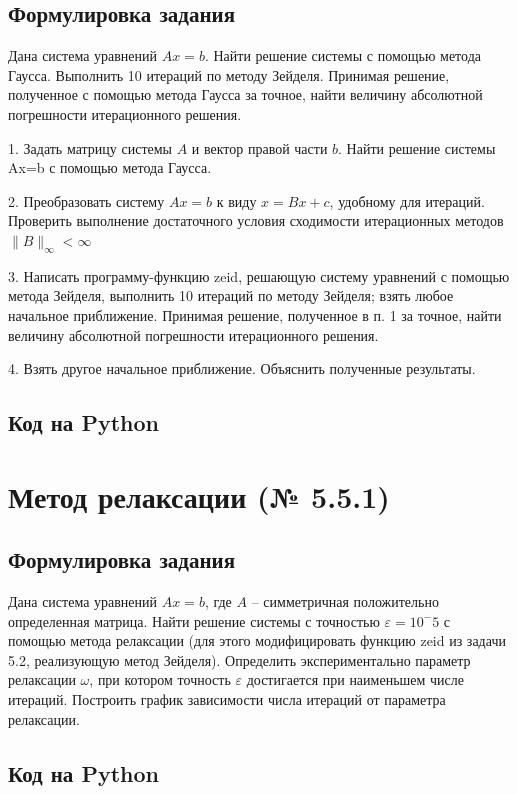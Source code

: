 \documentclass[a4paper,11pt]{article}
\theoremstyle{definition} %
\theoremstyle{remark} %
\begin{document}
\subsection{Формулировка задания}

Дана система уравнений $Ax=b$. Найти решение системы с помощью метода Гаусса. Выполнить 10 итераций по методу Зейделя. Принимая решение, полученное с помощью метода Гаусса за точное, найти величину абсолютной погрешности итерационного решения.

1. Задать матрицу системы $A$ и вектор правой части $b$. Найти решение системы Ax=b с помощью метода Гаусса. 

2. Преобразовать систему $Ax=b$ к виду $x=Bx+c$, удобному для итераций. Проверить выполнение достаточного условия сходимости итерационных методов $\|B\|_\infty < \infty$

3. Написать программу-функцию zeid, решающую систему уравнений с помощью метода Зейделя, выполнить 10 итераций по методу Зейделя; взять любое начальное приближение. Принимая решение, полученное в п. 1 за точное, найти величину абсолютной погрешности итерационного решения.

4. Взять другое начальное приближение. Объяснить полученные результаты.

\subsection{Код на Python}

\section{Метод релаксации (№ 5.5.1)}

\subsection{Формулировка задания}

Дана система уравнений $Ax=b$, где $A$ – симметричная положительно определенная матрица. 
Найти решение системы с точностью $\varepsilon = 10^-5$ с помощью метода релаксации (для этого модифицировать функцию zeid из задачи 5.2, реализующую метод Зейделя). 
Определить экспериментально параметр релаксации $\omega$, при котором точность $\varepsilon$ достигается при наименьшем числе итераций. 
Построить график зависимости числа итераций от параметра релаксации.

\subsection{Код на Python}
\end{document}
